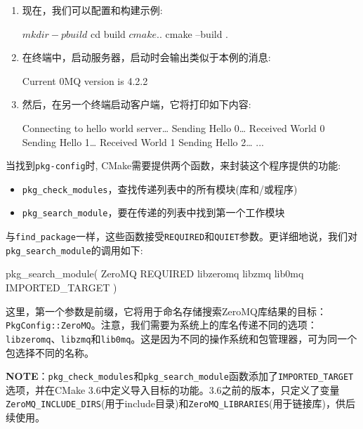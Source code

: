 \begin{enumerate}
\item 现在，我们可以配置和构建示例:

\begin{codebox}[shell]
$ mkdir -p build
$ cd build
$ cmake ..
$ cmake --build .
\end{codebox}

\item 在终端中，启动服务器，启动时会输出类似于本例的消息:

\begin{codebox}[shell]
Current 0MQ version is 4.2.2
\end{codebox}

\item 然后，在另一个终端启动客户端，它将打印如下内容:

\begin{codebox}[shell]
Connecting to hello world server…
Sending Hello 0…
Received World 0
Sending Hello 1…
Received World 1
Sending Hello 2…
...
\end{codebox}

\end{enumerate}


当找到\texttt{pkg-config}时, CMake需要提供两个函数，来封装这个程序提供的功能:

\begin{itemize}
\item \texttt{pkg\_check\_modules}，查找传递列表中的所有模块(库和/或程序)

\item \texttt{pkg\_search\_module}，要在传递的列表中找到第一个工作模块

\end{itemize}

与\texttt{find\_package}一样，这些函数接受\texttt{REQUIRED}和\texttt{QUIET}参数。更详细地说，我们对\texttt{pkg\_search\_module}的调用如下:

\begin{codebox}[cmake]
pkg_search_module(
  ZeroMQ
  REQUIRED
    libzeromq libzmq lib0mq
  IMPORTED_TARGET
  )
\end{codebox}

这里，第一个参数是前缀，它将用于命名存储搜索ZeroMQ库结果的目标：\texttt{PkgConfig::ZeroMQ}。注意，我们需要为系统上的库名传递不同的选项：\texttt{libzeromq}、\texttt{libzmq}和\texttt{lib0mq}。这是因为不同的操作系统和包管理器，可为同一个包选择不同的名称。

\begin{myInfoBox}
\textbf{NOTE}：\texttt{pkg\_check\_modules}和\texttt{pkg\_search\_module}函数添加了\texttt{IMPORTED\_TARGET}选项，并在CMake 3.6中定义导入目标的功能。3.6之前的版本，只定义了变量\texttt{ZeroMQ\_INCLUDE\_DIRS}(用于include目录)和\texttt{ZeroMQ\_LIBRARIES}(用于链接库)，供后续使用。
\end{myInfoBox}


